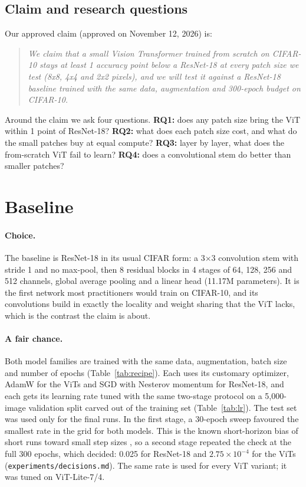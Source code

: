\documentclass[11pt]{article}
\newcommand{\file}[1]{\nolinkurl{#1}}
\begin{document}
\subsection{Claim and research questions}

Our approved claim (approved on November 12, 2026) is:

\begin{quote}
\emph{We claim that a small Vision Transformer trained from scratch on CIFAR-10 stays at least 1 accuracy point below a ResNet-18 at every patch size we test (8x8, 4x4 and 2x2 pixels), and we will test it against a ResNet-18 baseline trained with the same data, augmentation and 300-epoch budget on CIFAR-10.}
\end{quote}

\noindent Around the claim we ask four questions. \textbf{RQ1:} does any patch size bring the ViT within 1 point of ResNet-18? \textbf{RQ2:} what does each patch size cost, and what do the small patches buy at equal compute? \textbf{RQ3:} layer by layer, what does the from-scratch ViT fail to learn? \textbf{RQ4:} does a convolutional stem do better than smaller patches?

\section{Baseline}\label{sec:baseline}

\paragraph{Choice.} The baseline is ResNet-18 \citep{he2016resnet} in its usual CIFAR form: a 3$\times$3 convolution stem with stride 1 and no max-pool, then 8 residual blocks in 4 stages of 64, 128, 256 and 512 channels, global average pooling and a linear head (11.17M parameters). It is the first network most practitioners would train on CIFAR-10, and its convolutions build in exactly the locality and weight sharing that the ViT lacks, which is the contrast the claim is about.

\paragraph{A fair chance.} Both model families are trained with the same data, augmentation, batch size and number of epochs (Table~\ref{tab:recipe}). Each uses its customary optimizer, AdamW for the ViTs and SGD with Nesterov momentum for ResNet-18, and each gets its learning rate tuned with the same two-stage protocol on a 5,000-image validation split carved out of the training set (Table~\ref{tab:lr}). The test set was used only for the final runs. In the first stage, a 30-epoch sweep favoured the smallest rate in the grid for both models. This is the known short-horizon bias of short runs toward small step sizes \citep{wu2018shorthorizon}, so a second stage repeated the check at the full 300 epochs, which decided: 0.025 for ResNet-18 and $2.75\times10^{-4}$ for the ViTs (\file{experiments/decisions.md}). The same rate is used for every ViT variant; it was tuned on ViT-Lite-7/4.
\end{document}
